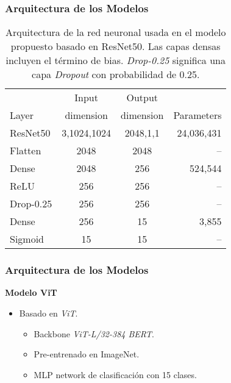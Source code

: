 \begin{frame}
\frametitle{Arquitectura de los Modelos}
\begin{table}[!ht]
    \centering
    \begin{tabular}{| l|c | c | r |}
    \hline
                 &     Input   &  Output    &  \\
    Layer        &   dimension & dimension  & Parameters \\
    \hline\hline
    ResNet50     &     3,1024,1024 &     2048,1,1 & 24,036,431 \\
    Flatten      &     2048        &     2048     &  --        \\
    Dense        &     2048        &     256      & 524,544    \\
    ReLU         &     256         &     256      & --         \\
    Drop-0.25  &     256         &     256      & --         \\
    Dense        &     256         &     15       &  3,855     \\
    Sigmoid      &     15          &     15       & --         \\
    \hline
    \end{tabular}
    \caption{Arquitectura de la red neuronal usada en el modelo propuesto basado en ResNet50. Las capas
    densas incluyen el término de bias. \textit{Drop-0.25} significa una capa \textit{Dropout} con
    probabilidad de 0.25.}
    \label{table_resnet50}
\end{table}
\end{frame}

\begin{frame}
\frametitle{Arquitectura de los Modelos}
    \textbf{Modelo ViT}
    \begin{itemize}
        \item Basado en \textit{ViT}.
        \begin{itemize}
            \item Backbone \textit{ViT-L/32-384 BERT}.
            \item Pre-entrenado en ImageNet.
            \item MLP network de clasificación con 15 clases.
        \end{itemize}
    \end{itemize}
\end{frame}

